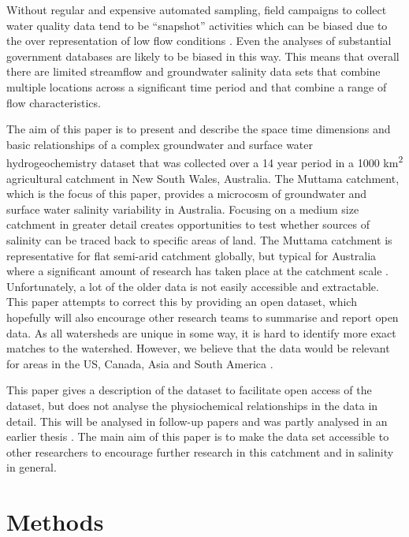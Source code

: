 \documentclass[, manuscript]{copernicus}
\begin{document}
Without regular and expensive automated sampling, field campaigns to
collect water quality data tend to be ``snapshot'' activities
\citep{Grayson1997, Breuer2015, Lyon2008, Cartwright2010, Lintern2018}
which can be biased due to the over representation of low flow
conditions \citep{Lessels2020}. Even the analyses of substantial
government databases \citep{Lintern2018} are likely to be biased in this
way. This means that overall there are limited streamflow and
groundwater salinity data sets that combine multiple locations across a
significant time period and that combine a range of flow
characteristics.

The aim of this paper is to present and describe the space time
dimensions and basic relationships of a complex groundwater and surface
water hydrogeochemistry dataset that was collected over a 14 year period
in a 1000 km\textsuperscript{2} agricultural catchment in New South
Wales, Australia. The Muttama catchment, which is the focus of this
paper, provides a microcosm of groundwater and surface water salinity
variability in Australia. Focusing on a medium size catchment in greater
detail creates opportunities to test whether sources of salinity can be
traced back to specific areas of land. The Muttama catchment is
representative for flat semi-arid catchment globally, but typical for
Australia where a significant amount of research has taken place at the
catchment scale
\citep[e.g.][]{crosbie2007, Hughes2007, hughes2008, Summerell2006}.
Unfortunately, a lot of the older data is not easily accessible and
extractable. This paper attempts to correct this by providing an open
dataset, which hopefully will also encourage other research teams to
summarise and report open data. As all watersheds are unique in some
way, it is hard to identify more exact matches to the watershed.
However, we believe that the data would be relevant for areas in the US,
Canada, Asia and South America
\citep{thorslund_vanvliet2020, stavi2021}.

This paper gives a description of the dataset to facilitate open access
of the dataset, but does not analyse the physiochemical relationships in
the data in detail. This will be analysed in follow-up papers and was
partly analysed in an earlier thesis \citep{Akter2018}. The main aim of
this paper is to make the data set accessible to other researchers to
encourage further research in this catchment and in salinity in general.

\section{Methods}
\end{document}
